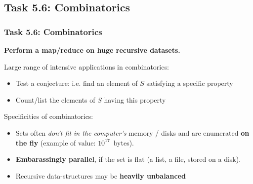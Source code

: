 \documentclass{beamer}
\begin{document}


\subsection{Task 5.6: Combinatorics}
\begin{frame}[fragile]
  \frametitle{Task 5.6: Combinatorics}

  \begin{center}
    {%
      \Large\bf
        Perform a {\color{red}map/reduce} on huge %
         {\color{blue}recursive} datasets.
    }
  \end{center}
  \begin{block}{Large range of intensive applications in combinatorics:}
  \begin{itemize}
  \item Test a conjecture: i.e. find an element of $S$ satisfying a specific
    property %
  \item Count/list the elements of $S$ having this property
  \end{itemize}
\end{block}

  \pause
  \begin{block}{Specificities of combinatorics:}
  \begin{itemize}
  \item Sets often \emph{don't fit in the computer's} memory / disks
    and are enumerated \textbf{on the fly} (example of value: $10^{17}$~bytes).
  \item \textbf{Embarassingly parallel}, if the set is flat (a list, a file, stored on a
    disk).
  \item Recursive data-structures may be \textbf{heavily unbalanced}
    
  \end{itemize}
\end{block}
\end{frame}
\end{document}
